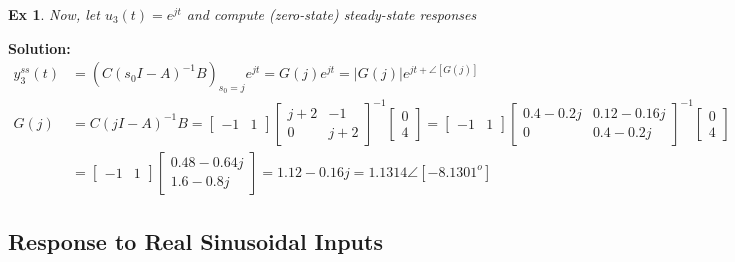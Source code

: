 \documentclass[twoside]{article}
\newtheorem{exmp}[theorem]{Ex}
\begin{document}
\begin{exmp}
Now, let $u_3(t) = e^{j t}$ and compute (zero-state) steady-state responses 
\end{exmp}

\textbf{Solution:}
\begin{align*} 
y_3^{ss}(t) &= \left( C \left(s_0 I - A \right)^{-1} B \right)_{s_0 = j} e^{j t} = G(j) e^{j t} = |G( j)| e^{j t + \angle [G(j)]}
\\ 
G(j) &= C (j I -A)^{-1} B =  \begin{bmatrix} -1 & 1 \end{bmatrix}  \begin{bmatrix} j+2 & -1 \\ 0 & j+2 \end{bmatrix}^{-1}  \begin{bmatrix} 0 \\ 4 \end{bmatrix} = 
\begin{bmatrix} -1 & 1 \end{bmatrix}  \begin{bmatrix} 0.4 - 0.2 j & 0.12 - 0.16 j \\ 0 & 0.4 - 0.2 j \end{bmatrix}^{-1}  \begin{bmatrix} 0 \\ 4 \end{bmatrix} 
\\
&= \begin{bmatrix} -1 & 1 \end{bmatrix} \begin{bmatrix} 0.48 - 0.64 j \\ 1.6 - 0.8 j \end{bmatrix} = 1.12 - 0.16 j = 1.1314 \angle[ -8.1301^o ]
\end{align*}

\subsection{Response to Real Sinusoidal Inputs}
\end{document}

